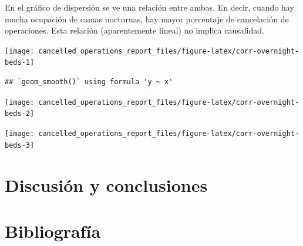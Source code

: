 \documentclass[
]{article}
\begin{document}
En el gráfico de dispersión se ve una relación entre ambas. En decir,
cuando hay mucha ocupación de camas nocturnas, hay mayor porcentaje de
cancelación de operaciones. Esta relación (aparentemente lineal) no
implica causalidad.

\begin{center}\texttt{[image: cancelled\_operations\_report\_files/figure-latex/corr-overnight-beds-1]} \end{center}

\begin{verbatim}
## `geom_smooth()` using formula 'y ~ x'
\end{verbatim}

\begin{center}\texttt{[image: cancelled\_operations\_report\_files/figure-latex/corr-overnight-beds-2]} \end{center}

\begin{center}\texttt{[image: cancelled\_operations\_report\_files/figure-latex/corr-overnight-beds-3]} \end{center}

\hypertarget{discusiuxf3n-y-conclusiones}{%
\section{Discusión y conclusiones}\label{discusiuxf3n-y-conclusiones}}

\hypertarget{bibliografuxeda}{%
\section{Bibliografía}\label{bibliografuxeda}}
\end{document}
